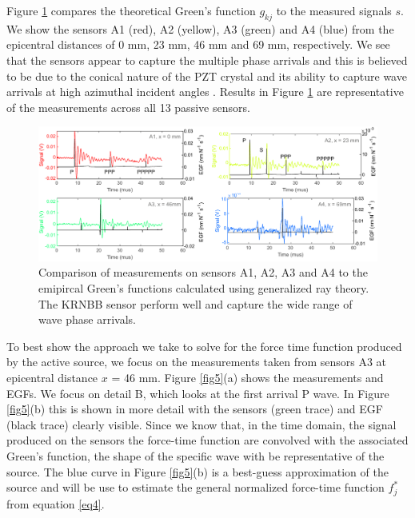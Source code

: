 \documentclass[preprint,3p, 11pt,authoryear]{elsarticle}
\begin{document}
Figure \ref{fig4} compares the theoretical Green's function $g_{kj}$ to the measured signals $s$.  We show the sensors A1 (red), A2 (yellow), A3 (green) and A4 (blue) from the epicentral distances of 0 mm, 23 mm, 46 mm and 69 mm, respectively. We see that the sensors appear to capture the multiple phase arrivals and this is believed to be due to the conical nature of the PZT crystal and its ability to capture wave arrivals at high azimuthal incident angles \citep{Selvadurai2019}. Results in Figure \ref{fig4} are representative of the measurements across all 13 passive sensors.

\begin{figure}[ht]
     	\centering
\includegraphics[scale= 0.90]{FIG4.pdf} 
\caption{Comparison of measurements on sensors A1, A2, A3 and A4 to the emipircal Green's functions calculated using generalized ray theory. The KRNBB sensor perform well and capture the wide range of wave phase arrivals.}
	\label{fig4} 
\end{figure}

To best show the approach we take to solve for the force time function produced by the active source, we focus on the measurements taken from sensors A3 at epicentral distance $x$ = 46 mm. Figure \ref{fig5}(a) shows the measurements and EGFs.  We focus on detail B, which looks at the first arrival P wave.  In Figure \ref{fig5}(b) this is shown in more detail with the sensors (green trace) and EGF (black trace) clearly visible.  Since we know that, in the time domain, the signal produced on the sensors the force-time function are convolved with the associated Green's function, the shape of the specific wave with be representative of the source. The blue curve in Figure \ref{fig5}(b) is a best-guess approximation of the source and will be use to estimate the general normalized force-time function $f^{*}_{j}$ from equation \eqref{eq4}.
\end{document}
